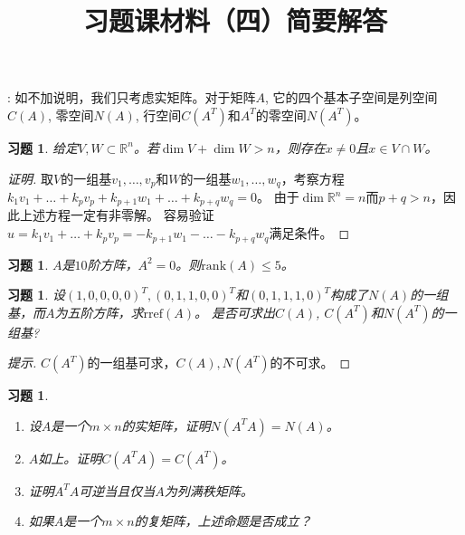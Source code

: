 \documentclass[UTF8]{ctexart}
\newcommand{\rref}{\mathrm{rref}}
\newcommand{\rank}{{\mathrm{rank}}}
\newtheorem{ex}[thm]{习题}
\begin{document}
\title{习题课材料（四）简要解答}

\date{}

\maketitle

\vspace{-1cm}





\medskip

: 如不加说明，我们只考虑实矩阵。对于矩阵$A$, 它的四个基本子空间是列空间$C(A)$, 零空间$N(A)$, 行空间$C(A^T)$和$A^T$的零空间$N(A^T)$。
\medskip

\begin{ex}
		给定$V,W\subset \mathbb{R}^n$。若$\dim V+\dim W>n$，则存在$x\ne0$且$x\in V\cap W$。
\end{ex}

\begin{proof}[证明]
	取$V$的一组基$v_1,\dots,v_p$和$W$的一组基$w_1,\dots,w_q$，考察方程$k_1v_1+\dots+k_pv_p+k_{p+1}w_1+\dots+k_{p+q}w_q=0$。
	由于$\dim \mathbb{R}^n=n$而$p+q>n$，因此上述方程一定有非零解。
	容易验证$u=k_1v_1+\dots+k_pv_p=-k_{p+1}w_1-\dots-k_{p+q}w_q$满足条件。
\end{proof}


\begin{ex}
		$A$是$10$阶方阵，$A^2=0$。则$\rank(A)\le5$。
\end{ex}

\begin{ex}
设$(1,0,0,0,0)^T,(0,1,1,0,0)^T$和$(0,1,1,1,0)^T$构成了$N(A)$的一组基，而$A$为五阶方阵，求$\rref(A)$。 是否可求出$C(A)$, $C(A^T)$和$N(A^T)$的一组基?
\end{ex}
\begin{proof}[提示]
	$C(A^T)$的一组基可求，$C(A),N(A^T)$的不可求。
\end{proof}


\begin{ex}
\begin{enumerate}
\item 设$A$是一个$m\times n$的实矩阵，证明$N(A^TA) = N(A)$。
\item $A$如上。证明$C(A^TA ) = C(A^T)$。
\item 证明$A^TA$可逆当且仅当$A$为列满秩矩阵。
\item 如果$A$是一个$m\times n$的复矩阵，上述命题是否成立？
\end{enumerate}
\end{ex}
\end{document}
